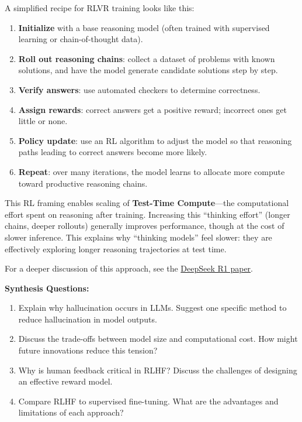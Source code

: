 A simplified recipe for RLVR training looks like this:  
\begin{enumerate}
    \item \textbf{Initialize} with a base reasoning model (often trained with supervised learning or chain-of-thought data).  
    \item \textbf{Roll out reasoning chains}: collect a dataset of problems with known solutions, and have the model generate candidate solutions step by step.  
    \item \textbf{Verify answers}: use automated checkers to determine correctness.  
    \item \textbf{Assign rewards}: correct answers get a positive reward; incorrect ones get little or none.  
    \item \textbf{Policy update}: use an RL algorithm to adjust the model so that reasoning paths leading to correct answers become more likely.  
    \item \textbf{Repeat}: over many iterations, the model learns to allocate more compute toward productive reasoning chains.  
\end{enumerate}

This RL framing enables scaling of \textbf{Test-Time Compute}---the computational effort spent on reasoning after training. Increasing this ``thinking effort'' (longer chains, deeper rollouts) generally improves performance, though at the cost of slower inference. This explains why ``thinking models'' feel slower: they are effectively exploring longer reasoning trajectories at test time.  

For a deeper discussion of this approach, see the \href{https://arxiv.org/abs/2501.12948}{DeepSeek R1 paper}.  

\begin{questionbox}
\textbf{Synthesis Questions:}

\begin{enumerate}
    \item Explain why hallucination occurs in LLMs. Suggest one specific method to reduce hallucination in model outputs.
    \item Discuss the trade-offs between model size and computational cost. How might future innovations reduce this tension?
    \item Why is human feedback critical in RLHF? Discuss the challenges of designing an effective reward model.
    \item Compare RLHF to supervised fine-tuning. What are the advantages and limitations of each approach?
\end{enumerate}
\end{questionbox}

